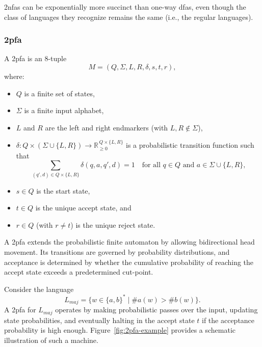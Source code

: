 \begin{observation}
\glspl{2nfa} can be exponentially more succinct than one-way \glspl{dfa}, even though the class of languages they recognize remains the same (i.e., the regular languages).
\end{observation}


\subsubsection{\acrfull{2pfa}}
\label{subsubsec:2pfa}

\begin{definition}
A \gls{2pfa} is an 8-tuple
\[
M = (Q, \Sigma, L, R, \delta, s, t, r),
\]
where:
\begin{itemize}
    \item \(Q\) is a finite set of states,
    \item \(\Sigma\) is a finite input alphabet,
    \item \(L\) and \(R\) are the left and right endmarkers (with \(L,R \notin \Sigma\)),
    \item \(\delta: Q \times (\Sigma \cup \{L,R\}) \to \mathbb{R}_{\ge 0}^{\,Q \times \{L,R\}}\) is a probabilistic transition function such that
    \[
    \sum_{(q',d)\in Q\times\{L,R\}} \delta(q,a,q',d) = 1 \quad \text{for all } q \in Q \text{ and } a \in \Sigma \cup \{L,R\},
    \]
    \item \(s\in Q\) is the start state,
    \item \(t\in Q\) is the unique accept state, and
    \item \(r\in Q\) (with \(r\neq t\)) is the unique reject state.
\end{itemize}
\end{definition}

\begin{remark}
A \gls{2pfa} extends the probabilistic finite automaton by allowing bidirectional head movement. Its transitions are governed by probability distributions, and acceptance is determined by whether the cumulative probability of reaching the accept state exceeds a predetermined cut-point.
\end{remark}

\begin{example}
Consider the language 
\[
L_{maj} = \{ w \in \{a,b\}^* \mid \#a(w) > \#b(w) \}.
\]
A \gls{2pfa} for \(L_{maj}\) operates by making probabilistic passes over the input, updating state probabilities, and eventually halting in the accept state \(t\) if the acceptance probability is high enough. Figure~\ref{fig:2pfa-example} provides a schematic illustration of such a machine.
\end{example}


